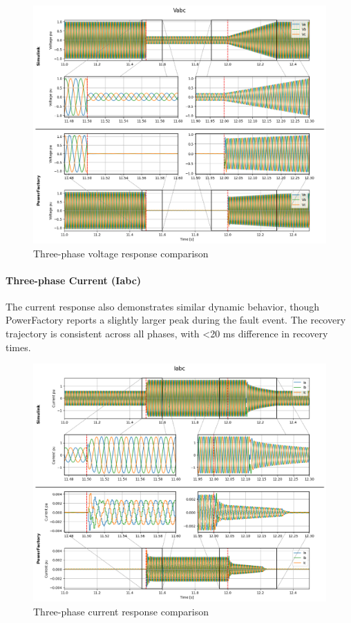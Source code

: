 \documentclass[conference]{IEEEtran}
\begin{document}
    \begin{figure}[t]
        \centering
        \includegraphics[width=1.0\linewidth, frame]{Figs/5_2_1/Vabc.png}
        \caption{Three-phase voltage response comparison}
        \label{fig:V}
    \end{figure}
    
    \paragraph{Three-phase Current (Iabc)} The current response also demonstrates similar dynamic behavior, though PowerFactory reports a slightly larger peak during the fault event. The recovery trajectory is consistent across all phases, with <20 ms difference in recovery times.
    
    \begin{figure}[t]
        \centering
        \includegraphics[width=1.0\linewidth, frame]{Figs/5_2_1/Iabc.png}
        \caption{Three-phase current response comparison}
        \label{fig:I}
    \end{figure}
    
\end{document}
